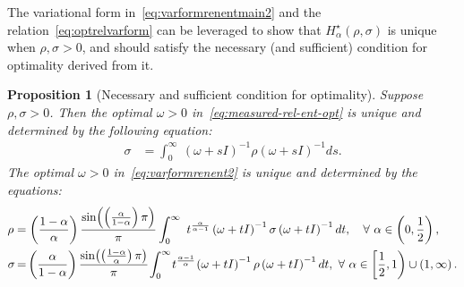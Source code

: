 \documentclass[10pt,a4paper]{amsart}
\newtheorem{prop}{Proposition}
\begin{document}
The variational form in~\eqref{eq:varformrenentmain2} and the relation~\eqref{eq:optrelvarform} can be leveraged to show that $H_{\alpha}^{\star}(\rho,\sigma)$ is unique when $\rho,\sigma>0$, and should satisfy the  necessary (and sufficient) condition for optimality derived from it.  \begin{prop}[Necessary and sufficient condition for optimality]
Suppose $\rho,\sigma>0$. 
Then the optimal $\omega>0$ in~\eqref{eq:measured-rel-ent-opt} is unique and determined by the following equation:
\begin{align}
\sigma & =\int_{0}^{\infty}\ \left(\omega+sI\right)^{-1}\rho\left(\omega+sI\right)^{-1}ds.\label{eq:opt-omega-measure-rel-ent}
\end{align}
The
optimal $\omega>0$ in~\eqref{eq:varformrenent2} is unique and determined by the equations:
\begin{align}
\rho & =\left(\frac{1-\alpha}{\alpha}\right)\frac{\sin\!\left(\left(\frac{\alpha}{1-\alpha}\right)\pi\right)}{\pi}\int_{0}^{\infty}\ t^{\frac{\alpha}{\alpha-1}}\left(\omega+tI\right)^{-1}\sigma\left(\omega+tI\right)^{-1}dt,~~~ \forall~ \alpha\in\left(0,\frac{1}{2}\right),\label{eq:optimal-omega-alpha-0-half} \\
\sigma \mspace{-2 mu}& =\mspace{-2 mu}\left(\frac{\alpha}{1-\alpha}\right)\frac{\sin\!\left(\left(\frac{1-\alpha}{\alpha}\right)\pi\right)}{\pi}\mspace{-2 mu}\int_{0}^{\infty}\mspace{-2 mu} t^{\frac{\alpha-1}{\alpha}}\mspace{-2 mu}\left(\omega+tI\right)^{-1}\rho\left(\omega+tI\right)^{-1}dt, ~ \forall~ \alpha\in\left[\frac{1}{2},1\right)\cup\left(1,\infty\right). \label{eq:optimal-omega-alpha-half-infty}
\end{align}
\end{prop}
\end{document}

